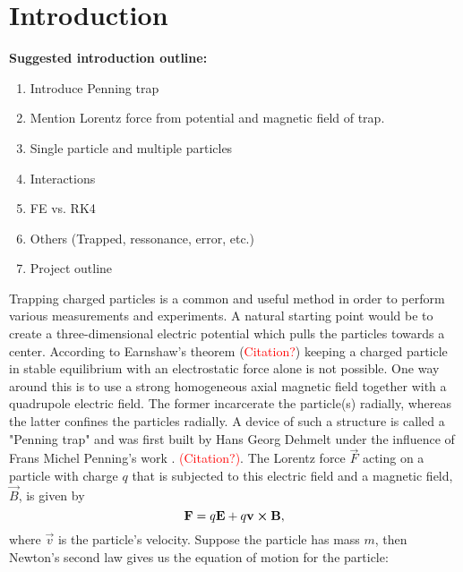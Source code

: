 \section{Introduction}\label{sec:introduction}


\textbf{Suggested introduction outline:}
\begin{enumerate}
    \item Introduce Penning trap 
    \item Mention Lorentz force from potential and magnetic field of trap. 
    \item Single particle and multiple particles 
    \item Interactions 
    \item FE vs. RK4 
    \item Others (Trapped, ressonance, error, etc.)
    \item Project outline 
\end{enumerate}

Trapping charged particles is a common and useful method in order to perform various measurements and experiments. A natural starting point would be to create a three-dimensional electric potential which pulls the particles towards a center. According to Earnshaw's theorem (\textcolor{red}{Citation?}) keeping a charged particle in stable equilibrium with an electrostatic force alone is not possible. One way around this is to use a strong homogeneous axial magnetic field together with a quadrupole electric field. The former incarcerate the particle(s) radially, whereas the latter confines the particles radially. A device of such a structure is called a "Penning trap" and was first built by Hans Georg Dehmelt under the influence of Frans Michel Penning's work \citep{Dehmelt1989}. \textcolor{red}{(Citation?)}. The Lorentz force $\vec{F}$ acting on a particle with charge $q$ that is subjected to this electric field and a magnetic field, $\vec{B}$, is given by 
\begin{equation}\label{eq:lorentz_force}
    \mathbf{F} = q\mathbf{E} + q \mathbf{v} \cross \mathbf{B},
\end{equation}
where $\vec{v}$ is the particle's velocity. Suppose the particle has mass $m$, then Newton's second law gives us the equation of motion for the particle:

